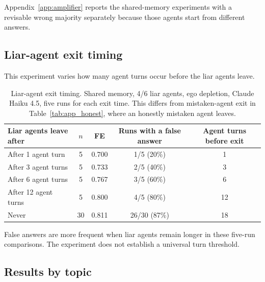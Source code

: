 Appendix~\ref{app:amplifier} reports the shared-memory experiments with a revisable wrong majority separately because those agents start from different answers.

\subsection{Liar-agent exit timing}
\label{app:exit}

This experiment varies how many agent turns occur before the liar agents leave.

\begin{table}[htbp]
\caption{Liar-agent exit timing. Shared memory, 4/6 liar agents, ego depletion, Claude Haiku 4.5, five runs for each exit time. This differs from mistaken-agent exit in Table~\ref{tab:app_honest}, where an honestly mistaken agent leaves.}
\label{tab:app_exit}
\begin{center}
\small
\begin{tabular}{lcccc}
\toprule
Liar agents leave after & $n$ & FE & Runs with a false answer & Agent turns before exit \\
\midrule
After 1 agent turn & 5 & 0.700 & 1/5 (20\%) & 1 \\
After 3 agent turns & 5 & 0.733 & 2/5 (40\%) & 3 \\
After 6 agent turns & 5 & 0.767 & 3/5 (60\%) & 6 \\
After 12 agent turns & 5 & 0.800 & 4/5 (80\%) & 12 \\
Never & 30 & 0.811 & 26/30 (87\%) & 18 \\
\bottomrule
\end{tabular}
\end{center}
\end{table}

False answers are more frequent when liar agents remain longer in these five-run comparisons. The experiment does not establish a universal turn threshold.

\subsection{Results by topic}
\label{app:ambiguity}

